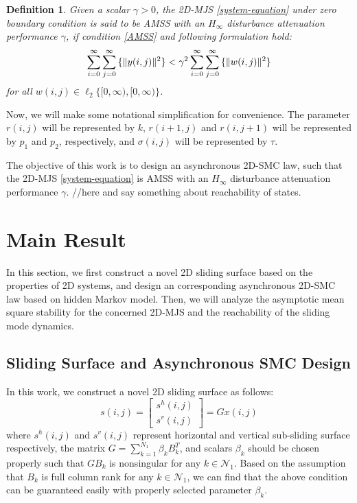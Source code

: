 \documentclass[journal,final,twocolumn]{IEEEtran}
\newtheorem{definition}{Definition}
\begin{document}
	\begin{definition}\label{H_infty-performance}
		Given a scalar $\gamma>0$, the 2D-MJS \eqref{system-equation} under zero boundary condition is said to be AMSS with an $H_{\infty}$ disturbance attenuation performance $\gamma$, if condition \eqref{AMSS} and following formulation hold:
		\begin{equation} \label{invDef2}
			\sum_{i=0}^{\infty}\sum_{j=0}^{\infty}\mathbb\{\|y(i,j)\|^{2}\} <  \gamma^{2} \sum_{i=0}^{\infty}\sum_{j=0}^{\infty}\mathbb\{\|w(i,j)\|^{2}\}
		\end{equation}
		for all $w(i,j)\in\ell_{2}\{[0,\infty),[0,\infty)\}$.
	\end{definition}
	
	Now, we will make some notational simplification for convenience. The parameter $r(i,j)$ will be represented by $k$, $r(i+1,j)$ and $r(i,j+1)$ will be represented by $p_1$ and $p_2$, respectively, and $\sigma(i,j)$ will be represented by $\tau$. 
	
	
	
	 The objective of this work is to design an asynchronous  2D-SMC law, such that the 2D-MJS \eqref{system-equation} is AMSS with an $H_{\infty}$ disturbance attenuation performance $\gamma$. //here and say something about reachability of states.

\section{Main Result}
In this section, we first construct a novel 2D sliding surface based on the properties of 2D systems, and design an  corresponding  asynchronous 2D-SMC law based on hidden Markov model.  Then, we will analyze the asymptotic mean square stability for the concerned 2D-MJS and the reachability of the sliding mode dynamics.

\subsection{ Sliding Surface and Asynchronous SMC Design} \label{sliding-surface}
	In this work, we construct a novel 2D sliding surface as follows: 
	\begin{equation}\label{siding-surface-equation}	
		s(i,j) = \begin{bmatrix}
					s^{h}(i,j)\\
					s^{v}(i,j)
					\end{bmatrix}
			   = Gx(i,j)
	\end{equation}
	where $s^{h}(i,j)$ and $s^{v}(i,j)$ represent horizontal and vertical sub-sliding surface respectively, the matrix $G=\sum_{k=1}^{N_{1}}\beta_{k}B^{T}_{k}$, and scalars $\beta_{k}$ should be chosen properly such that $GB_{k}$ is nonsingular for any $k\in\mathcal{N}_{1}$. Based on the assumption that $B_{k}$ is full column rank for any $k\in\mathcal{N}_{1}$, we can find that the above condition can be guaranteed easily with properly selected parameter $\beta_{k}$. 
 	
\end{document}

